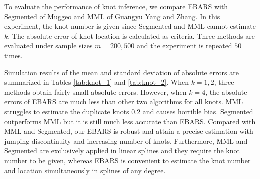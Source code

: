 To evaluate the performance of knot inference, we compare EBARS with Segmented of Muggeo and MML of Guangyu Yang and Zhang. In this experiment, the knot number is given since Segmented and MML cannot estimate $k$. The absolute error of knot location is calculated as criteria. Three methods are evaluated under sample sizes $m=200,500$ and the experiment is repeated $50$ times.

Simulation results of the mean and standard deviation of absolute errors are summarized in Tables \ref{tab:knot_1} and \ref{tab:knot_2}. When $k=1,2$, three methods obtain fairly small absolute errors. However, when $k=4$, the absolute errors of EBARS are much less than other two algorithms for all knots. MML struggles to estimate the duplicate knots $0.2$ and causes horrible bias. Segmented outperforms MML but it is still much less accurate than EBARS. Compared with MML and Segmented, our EBARS is robust and attain a precise estimation with jumping discontinuity and increasing number of knots. Furthermore, MML and Segmented are exclusively applied in linear splines and they require the knot number to be given, whereas EBARS is convenient to estimate the knot number and location simultaneously in splines of any degree.





